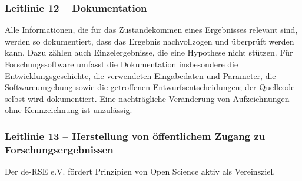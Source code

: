 \documentclass[a4paper, fontsize=11pt]{scrartcl}
\begin{document}
\subsubsection*{Leitlinie 12 -- Dokumentation}
Alle Informationen, die für das Zustandekommen eines Ergebnisses relevant sind, werden so dokumentiert, dass das Ergebnis nachvollzogen und überprüft werden kann. Dazu zählen auch Einzelergebnisse, die eine Hypothese nicht stützen. Für Forschungssoftware umfasst die Dokumentation insbesondere die Entwicklungsgeschichte, die verwendeten Eingabedaten und Parameter, die Softwareumgebung sowie die getroffenen Entwurfsentscheidungen; der Quellcode selbst wird dokumentiert. Eine nachträgliche Veränderung von Aufzeichnungen ohne Kennzeichnung ist unzulässig.

\subsubsection*{Leitlinie 13 -- Herstellung von öffentlichem Zugang zu Forschungsergebnissen}
Der de-RSE e.V. fördert Prinzipien von Open Science aktiv als Vereinsziel.
\end{document}
